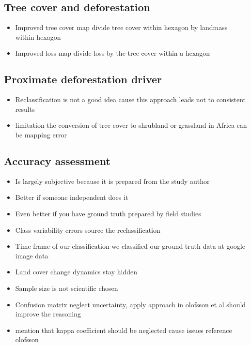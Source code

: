		\subsection{Tree cover and deforestation}
		\label{subsec:discussion_tree_cover_and_deforestation}
			\begin{itemize}
				\item Improved tree cover map divide tree cover within hexagon by landmass within hexagon
				\item Improved loss map divide loss by the tree cover within a hexagon
			\end{itemize}

		\subsection{Proximate deforestation driver}
		\label{subsec:discussion_proxy_deforestation_driver}
			\begin{itemize}
				\item Reclassification is not a good idea cause this approach leads not to consistent results
				\item limitation the conversion of tree cover to shrubland or grassland in Africa can be mapping error
			\end{itemize}

		\subsection{Accuracy assessment}
		\label{subsec:discussion_accuracy_assessment}
			\begin{itemize}
				\item Is largely subjective because it is prepared from the study author
				\item Better if someone independent does it 
				\item Even better if you have ground truth prepared by field studies
				\item Class variability errors source the reclassification
				\item Time frame of our classification we classified our ground truth data at google image data
				\item Land cover change dynamics stay hidden
				\item Sample size is not scientific chosen
				\item Confusion matrix neglect uncertainty, apply approach in olofsson et al should improve the reasoning
				\item mention that kappa coefficient should be neglected cause issues reference olofsson 
			\end{itemize}


